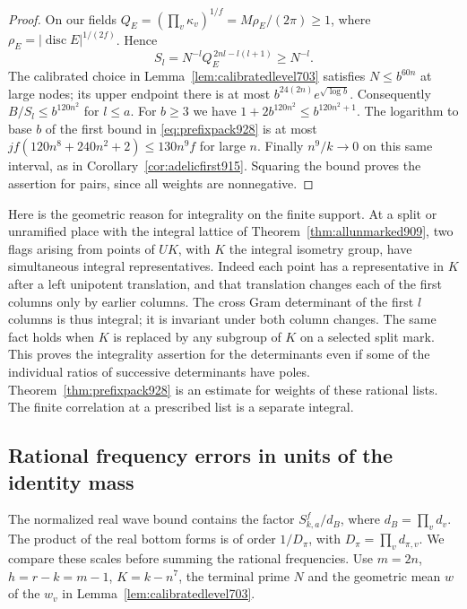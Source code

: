 \documentclass[a4paper,11pt]{article}
\theoremstyle{definition}
\theoremstyle{remark}
\numberwithin{equation}{section}
\begin{document}
\begin{proof}
On our fields \(Q_E=(\prod_v\kappa_v)^{1/f}=M\rho_E/(2\pi)\ge1\),
where \(\rho_E=|\operatorname{disc}E|^{1/(2f)}\). Hence
\[
 S_l=N^{-l}Q_E^{\,2nl-l(l+1)}\ge N^{-l}.
\]
The calibrated choice in Lemma~\ref{lem:calibratedlevel703}
satisfies \(N\le b^{60n}\) at large nodes; its upper endpoint
there is at most \(b^{24(2n)}e^{\sqrt{\log b}}\). Consequently
\(B/S_l\le b^{120n^2}\) for \(l\le a\). For \(b\ge3\) we have
\(1+2b^{120n^2}\le b^{120n^2+1}\). The logarithm to base \(b\)
of the first bound in \eqref{eq:prefixpack928} is at most
\(jf(120n^8+240n^2+2)\le130 n^9 f\) for large \(n\).
Finally \(n^9/k\to0\) on this same interval, as in
Corollary~\ref{cor:adelicfirst915}. Squaring the bound proves
the assertion for pairs, since all weights are nonnegative.
\end{proof}

Here is the geometric reason for integrality on the finite
support. At a split or unramified place with the integral
lattice of Theorem~\ref{thm:allunmarked909}, two flags arising
from points of \(UK\), with \(K\) the integral isometry group,
have simultaneous integral representatives. Indeed each point
has a representative in \(K\) after a left unipotent translation,
and that translation changes each of the first columns only by
earlier columns. The cross Gram determinant of the first \(l\)
columns is thus integral; it is invariant under both column
changes. The same fact holds when \(K\) is replaced by any
subgroup of \(K\) on a selected split mark. This proves the
integrality assertion for the determinants even if some of the
individual ratios of successive determinants have poles.
Theorem~\ref{thm:prefixpack928} is an estimate for weights of
these rational lists. The finite correlation at a prescribed
list is a separate integral.
\clearpage

\subsection{Rational frequency errors in units of the identity mass}
\label{sec:identityfrequency929}

The normalized real wave bound contains the factor
\(S_{k,a}^f/d_B\), where \(d_B=\prod_v d_v\).
The product of the real bottom forms is of order
\(1/D_\pi\), with \(D_\pi=\prod_v d_{\pi,v}\).
We compare these scales before summing the rational frequencies.
Use \(m=2n\), \(h=r-k=m-1\), \(K=k-n^7\), the terminal
prime \(N\) and the geometric mean \(w\) of the \(w_v\) in
Lemma~\ref{lem:calibratedlevel703}.
\end{document}

